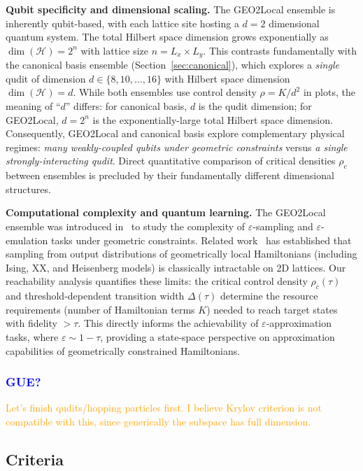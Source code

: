 \documentclass[aps,prx,reprint,superscriptaddress,footnote, twocolumn,notitlepage]{revtex4-2}
\newcommand{\yu}[1]{\textcolor{blue}{#1}}
\newcommand{\ko}[1]{\textcolor{orange}{#1}}
\begin{document}
\textbf{Qubit specificity and dimensional scaling.} The GEO2Local ensemble is inherently qubit-based, with each lattice site hosting a $d=2$ dimensional quantum system. The total Hilbert space dimension grows exponentially as $\dim(\mathcal{H}) = 2^{n}$ with lattice size $n = L_x \times L_y$. This contrasts fundamentally with the canonical basis ensemble (Section~\ref{sec:canonical}), which explores a \emph{single} qudit of dimension $d \in \{8, 10, \ldots, 16\}$ with Hilbert space dimension $\dim(\mathcal{H}) = d$. While both ensembles use control density $\rho = K/d^2$ in plots, the meaning of ``$d$'' differs: for canonical basis, $d$ is the qudit dimension; for GEO2Local, $d = 2^n$ is the exponentially-large total Hilbert space dimension. Consequently, GEO2Local and canonical basis explore complementary physical regimes: \emph{many weakly-coupled qubits under geometric constraints} versus \emph{a single strongly-interacting qudit}. Direct quantitative comparison of critical densities $\rho_c$ between ensembles is precluded by their fundamentally different dimensional structures.

\textbf{Computational complexity and quantum learning.} The GEO2Local ensemble was introduced in~\cite{https://arxiv.org/html/2510.06321v1} to study the complexity of $\varepsilon$-sampling and $\varepsilon$-emulation tasks under geometric constraints. Related work~\cite{https://arxiv.org/html/2312.07658v1} has established that sampling from output distributions of geometrically local Hamiltonians (including Ising, XX, and Heisenberg models) is classically intractable on 2D lattices. Our reachability analysis quantifies these limits: the critical control density $\rho_c(\tau)$ and threshold-dependent transition width $\Delta(\tau)$ determine the resource requirements (number of Hamiltonian terms $K$) needed to reach target states with fidelity $> \tau$. This directly informs the achievability of $\varepsilon$-approximation tasks, where $\varepsilon \sim 1 - \tau$, providing a state-space perspective on approximation capabilities of geometrically constrained Hamiltonians.
\subsubsection{\yu{GUE?}}
\ko{Let's finish qudits/hopping particles first. I believe Krylov criterion is not compatible with this, since generically the subspace has full dimension.}
\subsection{Criteria}
\end{document}
